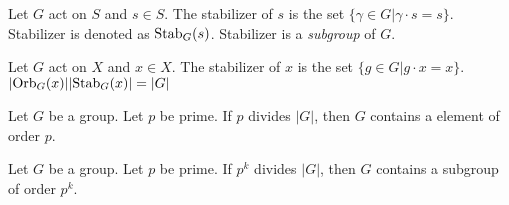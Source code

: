 \documentclass[12pt]{article}
\begin{document}
\begin{definition}[Stabilizer]\label{def:stabilizer} 
	Let $G$ act on $S$ and $s \in S$. The stabilizer of $s$ is the set $\{\gamma \in G | \gamma\cdot s = s\}$. Stabilizer is denoted as $\text{Stab}_{G}({s})$.
	Stabilizer is a \emph{subgroup} of $G$. 
\end{definition}


\begin{theorem}
	Let $G$ act on $X$ and $x \in X$. The stabilizer of $x$ is the set $\{g \in G | g\cdot x = x\}$.
	$|\text{Orb}_{G}({x})||\text{Stab}_{G}({x})|=|G|$
\end{theorem}

\begin{theorem}
	Let $G$ be a group. Let $p$ be prime. If $p$ divides $|G|$, then $G$ contains a element of order $p$.
\end{theorem}

\begin{theorem}
	Let $G$ be a group. Let $p$ be prime. If $p^k$ divides $|G|$, then $G$ contains a subgroup of order $p^k$.
\end{theorem}
\end{document}
